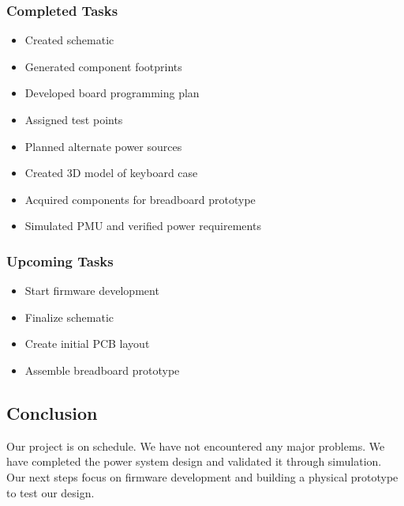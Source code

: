 \documentclass[a4paper,11pt]{article}%
\begin{document}
\subsubsection{Completed Tasks}
\begin{itemize}
    \item Created schematic
    \item Generated component footprints
    \item Developed board programming plan
    \item Assigned test points
    \item Planned alternate power sources
    \item Created 3D model of keyboard case
    \item Acquired components for breadboard prototype
    \item Simulated PMU and verified power requirements
\end{itemize}

\subsubsection{Upcoming Tasks}
\begin{itemize}
    \item Start firmware development
    \item Finalize schematic
    \item Create initial PCB layout
    \item Assemble breadboard prototype
\end{itemize}

\subsection{Conclusion}

Our project is on schedule. We have not encountered any major problems. We have completed the power system design and validated it through simulation. Our next steps focus on firmware development and building a physical prototype to test our design.








\end{document}
